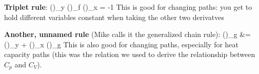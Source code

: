 \documentclass[12pt]{article}
\begin{document}
\textbf{Triplet rule}:
\eqs
\Big(\Big)_y \Big(\Big)_f \Big(\Big)_x = -1
\eqe
This is good for changing paths: you get to hold different variables constant when taking the other two derivatves

\textbf{Another, unnamed rule} (Mike calls it the generalized chain rule):
\eqs
\label{genChainRule}
\left(\right)_g &= \left(\right)_y + \left(\right)_x \cdot \left(\right)_g
\eqe
This is also good for changing paths, especially for heat capacity paths (this was the relation we used to derive the relationship between $C_p$ and $C_V$).
\end{document}
